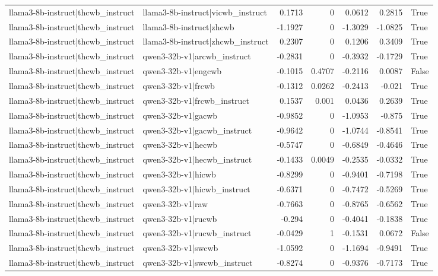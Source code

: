 \begin{table}
\begin{tabular}{l l r r r r l}
llama3-8b-instruct|thcwb_instruct & llama3-8b-instruct|vicwb_instruct & 0.1713 & 0 & 0.0612 & 0.2815 & True \\
llama3-8b-instruct|thcwb_instruct & llama3-8b-instruct|zhcwb & -1.1927 & 0 & -1.3029 & -1.0825 & True \\
llama3-8b-instruct|thcwb_instruct & llama3-8b-instruct|zhcwb_instruct & 0.2307 & 0 & 0.1206 & 0.3409 & True \\
llama3-8b-instruct|thcwb_instruct & qwen3-32b-v1|arcwb_instruct & -0.2831 & 0 & -0.3932 & -0.1729 & True \\
llama3-8b-instruct|thcwb_instruct & qwen3-32b-v1|engcwb & -0.1015 & 0.4707 & -0.2116 & 0.0087 & False \\
llama3-8b-instruct|thcwb_instruct & qwen3-32b-v1|frcwb & -0.1312 & 0.0262 & -0.2413 & -0.021 & True \\
llama3-8b-instruct|thcwb_instruct & qwen3-32b-v1|frcwb_instruct & 0.1537 & 0.001 & 0.0436 & 0.2639 & True \\
llama3-8b-instruct|thcwb_instruct & qwen3-32b-v1|gacwb & -0.9852 & 0 & -1.0953 & -0.875 & True \\
llama3-8b-instruct|thcwb_instruct & qwen3-32b-v1|gacwb_instruct & -0.9642 & 0 & -1.0744 & -0.8541 & True \\
llama3-8b-instruct|thcwb_instruct & qwen3-32b-v1|hecwb & -0.5747 & 0 & -0.6849 & -0.4646 & True \\
llama3-8b-instruct|thcwb_instruct & qwen3-32b-v1|hecwb_instruct & -0.1433 & 0.0049 & -0.2535 & -0.0332 & True \\
llama3-8b-instruct|thcwb_instruct & qwen3-32b-v1|hicwb & -0.8299 & 0 & -0.9401 & -0.7198 & True \\
llama3-8b-instruct|thcwb_instruct & qwen3-32b-v1|hicwb_instruct & -0.6371 & 0 & -0.7472 & -0.5269 & True \\
llama3-8b-instruct|thcwb_instruct & qwen3-32b-v1|raw & -0.7663 & 0 & -0.8765 & -0.6562 & True \\
llama3-8b-instruct|thcwb_instruct & qwen3-32b-v1|rucwb & -0.294 & 0 & -0.4041 & -0.1838 & True \\
llama3-8b-instruct|thcwb_instruct & qwen3-32b-v1|rucwb_instruct & -0.0429 & 1 & -0.1531 & 0.0672 & False \\
llama3-8b-instruct|thcwb_instruct & qwen3-32b-v1|swcwb & -1.0592 & 0 & -1.1694 & -0.9491 & True \\
llama3-8b-instruct|thcwb_instruct & qwen3-32b-v1|swcwb_instruct & -0.8274 & 0 & -0.9376 & -0.7173 & True \\

\end{tabular}
\end{table}
